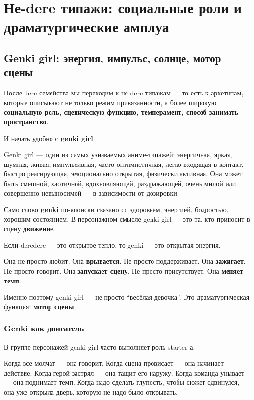 \setcounter{chapter}{3}
\chapter{Не-dere типажи: социальные роли и драматургические амплуа}

\setcounter{section}{0}
\section{Genki girl: энергия, импульс, солнце, мотор сцены}

После dere-семейства мы переходим к не-dere типажам --- то есть к
архетипам, которые описывают не только режим привязанности, а более
широкую \textbf{социальную роль, сценическую функцию, темперамент,
способ занимать пространство}.

И начать удобно с \textbf{genki girl}.

Genki girl --- один из самых узнаваемых аниме-типажей: энергичная,
яркая, шумная, живая, импульсивная, часто оптимистичная, легко входящая
в контакт, быстро реагирующая, эмоционально открытая, физически
активная. Она может быть смешной, хаотичной, вдохновляющей,
раздражающей, очень милой или совершенно невыносимой --- в зависимости
от дозировки.

Само слово \textbf{genki} по-японски связано со здоровьем, энергией,
бодростью, хорошим состоянием. В персонажном смысле genki girl --- это
та, кто приносит в сцену \textbf{движение}.

Если deredere --- это открытое тепло, то genki --- это открытая энергия.

Она не просто любит. Она \textbf{врывается}. Не просто поддерживает. Она
\textbf{зажигает}. Не просто говорит. Она \textbf{запускает сцену}. Не
просто присутствует. Она \textbf{меняет темп}.

Именно поэтому genki girl --- не просто ``весёлая девочка''. Это
драматургическая функция: \textbf{мотор сцены}.

\subsection*{Genki как двигатель}

В группе персонажей genki girl часто выполняет роль starter-а.

Когда все молчат --- она говорит. Когда сцена провисает --- она начинает
действие. Когда герой застрял --- она тащит его наружу. Когда команда
унывает --- она поднимает темп. Когда надо сделать глупость, чтобы сюжет
сдвинулся, --- она уже открыла дверь, которую не надо было открывать.

